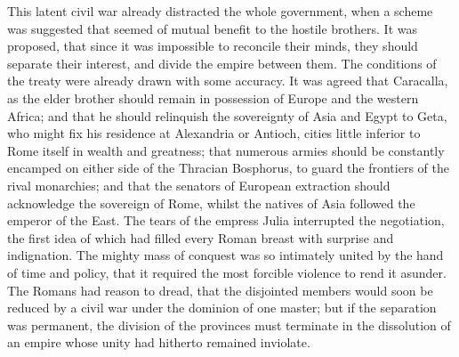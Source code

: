 This latent civil war already distracted the whole government,
when a scheme was suggested that seemed of mutual benefit to the
hostile brothers. It was proposed, that since it was impossible
to reconcile their minds, they should separate their interest,
and divide the empire between them. The conditions of the treaty
were already drawn with some accuracy. It was agreed that
Caracalla, as the elder brother should remain in possession of
Europe and the western Africa; and that he should relinquish the
sovereignty of Asia and Egypt to Geta, who might fix his
residence at Alexandria or Antioch, cities little inferior to
Rome itself in wealth and greatness; that numerous armies should
be constantly encamped on either side of the Thracian Bosphorus,
to guard the frontiers of the rival monarchies; and that the
senators of European extraction should acknowledge the sovereign
of Rome, whilst the natives of Asia followed the emperor of the
East. The tears of the empress Julia interrupted the negotiation,
the first idea of which had filled every Roman breast with
surprise and indignation. The mighty mass of conquest was so
intimately united by the hand of time and policy, that it
required the most forcible violence to rend it asunder. The
Romans had reason to dread, that the disjointed members would
soon be reduced by a civil war under the dominion of one master;
but if the separation was permanent, the division of the
provinces must terminate in the dissolution of an empire whose
unity had hitherto remained inviolate.\footnotemark[20]


